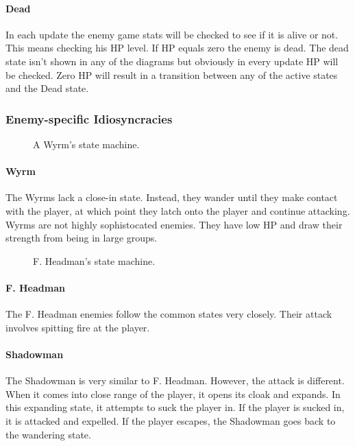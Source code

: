 \documentclass{article}
\begin{document}
\paragraph{Dead}
In each update the enemy game stats will be checked to see if it is alive or not.  This means checking his HP level.  If HP equals zero the enemy is dead.  The dead state isn't shown in any of the diagrams but obviously in every update HP will be checked.  Zero HP will result in a transition between any of the active states and the Dead state.

\subsubsection{Enemy-specific Idiosyncracies}

\begin{figure}[h!]
{

}
\caption{A Wyrm's state machine.}
\label{FSMWyrm}

\end{figure}
\paragraph{Wyrm}
The Wyrms lack a close-in state.  Instead, they wander until they make contact with the player, at which point they latch onto the player and continue attacking.  Wyrms are not highly sophistocated enemies.  They have low HP and draw their strength from being in large groups.

\begin{figure}[h!]
{

}
\caption{F. Headman's state machine.}
\label{FSMFHead}
\end{figure}

\paragraph{F. Headman}
The F. Headman enemies follow the common states very closely.  Their attack involves spitting fire at the player.

\paragraph{Shadowman}
The Shadowman is very similar to F. Headman.  However, the attack is different.  When it comes into close range of the player, it opens its cloak and expands.  In this expanding state, it attempts to suck the player in.  If the player is sucked in, it is attacked and expelled.  If the player escapes, the Shadowman goes back to the wandering state.
\end{document}
